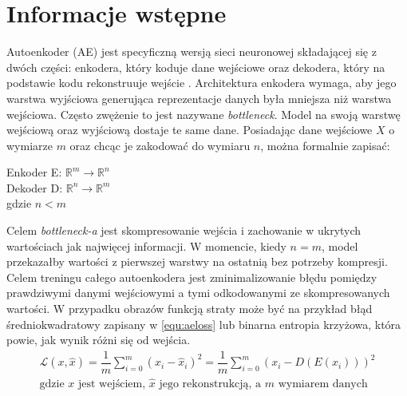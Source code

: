 \documentclass[a4paper,12pt,oneside]{book} %
\begin{document}
\section{Informacje wstępne}
Autoenkoder (AE) jest specyficzną wersją sieci neuronowej składającej się z dwóch części: enkodera, który koduje dane wejściowe oraz dekodera, który na podstawie kodu rekonstruuje wejście \cite{bank2021autoencoders}. Architektura enkodera wymaga, aby jego warstwa wyjściowa generująca reprezentacje danych była mniejsza niż warstwa wejściowa. Często zwężenie to jest nazywane \textit{bottleneck}. Model na swoją warstwę wejściową oraz wyjściową dostaje te same dane. Posiadając dane wejściowe $X$ o wymiarze $m$ oraz chcąc je zakodować do wymiaru $n$, można formalnie zapisać:

\begin{center}
	Enkoder E: $\mathbb{R}^m \rightarrow \mathbb{R}^n$\\
	Dekoder D: $\mathbb{R}^n \rightarrow \mathbb{R}^m$\\
	gdzie $n < m$\\
\end{center}
Celem \textit{bottleneck-a} jest skompresowanie wejścia i zachowanie w ukrytych wartościach jak najwięcej informacji. W momencie, kiedy $n = m$, model przekazałby wartości z pierwszej warstwy na ostatnią bez potrzeby kompresji. Celem treningu całego autoenkodera jest zminimalizowanie błędu pomiędzy prawdziwymi danymi wejściowymi a tymi odkodowanymi ze skompresowanych wartości. W przypadku obrazów funkcją straty może być na przykład błąd średniokwadratowy zapisany w \ref{equ:aeloss} lub binarna entropia krzyżowa, która powie, jak wynik różni się od wejścia. 
 \begin{equation}
 	\begin{aligned}
 		 \mathcal{L}(x, \hat{x}) = \dfrac{1}{m}\displaystyle\sum_{i=0}^{m}(x_i-\hat{x}_i)^2 =\dfrac{1}{m}\displaystyle\sum_{i=0}^{m}(x_i-D(E(x_i)))^2\\[1ex]
 		\text{gdzie $x$ jest wejściem, $\hat{x}$ jego rekonstrukcją, a $m$ wymiarem danych}
 		 \label{equ:aeloss}
 	\end{aligned}
 \end{equation}
\end{document}
